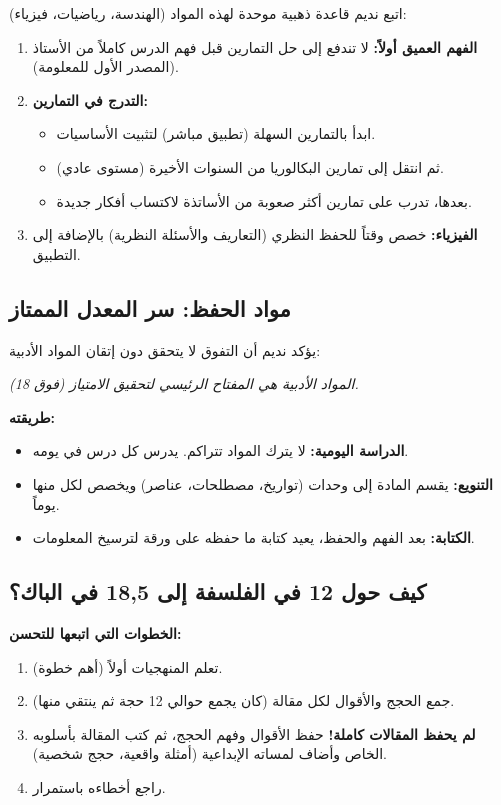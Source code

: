 \documentclass[12pt,a4paper]{book}
\newcommand{\quoteAr}[1]{%
	\begin{myquote}
		\itshape #1
	\end{myquote}
}
\begin{document}
	اتبع نديم قاعدة ذهبية موحدة لهذه المواد (الهندسة، رياضيات، فيزياء):
	\begin{enumerate}
		\item \textbf{الفهم العميق أولاً:} لا تندفع إلى حل التمارين قبل فهم الدرس كاملاً من الأستاذ (المصدر الأول للمعلومة).
		\item \textbf{التدرج في التمارين:}
		\begin{itemize}
			\item ابدأ بالتمارين السهلة (تطبيق مباشر) لتثبيت الأساسيات.
			\item ثم انتقل إلى تمارين البكالوريا من السنوات الأخيرة (مستوى عادي).
			\item بعدها، تدرب على تمارين أكثر صعوبة من الأساتذة لاكتساب أفكار جديدة.
		\end{itemize}
		\item \textbf{الفيزياء:} خصص وقتاً للحفظ النظري (التعاريف والأسئلة النظرية) بالإضافة إلى التطبيق.
	\end{enumerate}
	
	\subsection{مواد الحفظ: سر المعدل الممتاز}
	يؤكد نديم أن التفوق لا يتحقق دون إتقان المواد الأدبية:
	\quoteAr{المواد الأدبية هي المفتاح الرئيسي لتحقيق الامتياز (فوق 18).}
	\textbf{طريقته:}
	\begin{itemize}
		\item \textbf{الدراسة اليومية:} لا يترك المواد تتراكم. يدرس كل درس في يومه.
		\item \textbf{التنويع:} يقسم المادة إلى وحدات (تواريخ، مصطلحات، عناصر) ويخصص لكل منها يوماً.
		\item \textbf{الكتابة:} بعد الفهم والحفظ، يعيد كتابة ما حفظه على ورقة لترسيخ المعلومات.
	\end{itemize}
	
	\subsection{كيف حول 12 في الفلسفة إلى 18,5 في الباك؟}
	
	
	\textbf{الخطوات التي اتبعها للتحسن:}
	\begin{enumerate}
		\item تعلم المنهجيات أولاً (أهم خطوة).
		\item جمع الحجج والأقوال لكل مقالة (كان يجمع حوالي 12 حجة ثم ينتقي منها).
		\item \textbf{لم يحفظ المقالات كاملة!} حفظ الأقوال وفهم الحجج، ثم كتب المقالة بأسلوبه الخاص وأضاف لمساته الإبداعية (أمثلة واقعية، حجج شخصية).
		\item راجع أخطاءه باستمرار.
	\end{enumerate}
	
\end{document}
